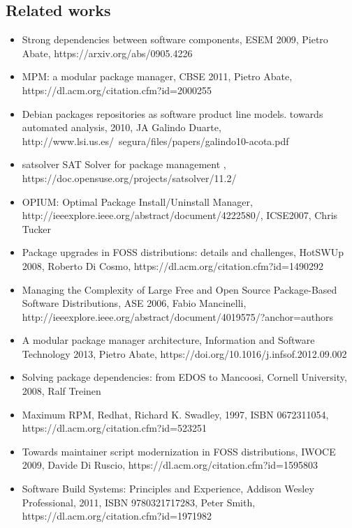 \subsection{Related works}
\begin{itemize}
    \item Strong dependencies between software components, ESEM 2009, 	Pietro Abate, https://arxiv.org/abs/0905.4226
    \item MPM: a modular package manager, CBSE 2011, Pietro Abate, https://dl.acm.org/citation.cfm?id=2000255
    \item Debian packages repositories as software product line models. towards automated analysis, 2010, JA Galindo Duarte, http://www.lsi.us.es/~segura/files/papers/galindo10-acota.pdf
    \item satsolver SAT Solver for package management , https://doc.opensuse.org/projects/satsolver/11.2/
    \item OPIUM: Optimal Package Install/Uninstall Manager, http://ieeexplore.ieee.org/abstract/document/4222580/, ICSE2007, Chris Tucker
    \item Package upgrades in FOSS distributions: details and challenges, HotSWUp 2008, Roberto Di Cosmo, https://dl.acm.org/citation.cfm?id=1490292
    \item Managing the Complexity of Large Free and Open Source Package-Based Software Distributions, ASE 2006, Fabio Mancinelli, http://ieeexplore.ieee.org/abstract/document/4019575/?anchor=authors
    \item A modular package manager architecture, Information and Software Technology 2013, Pietro Abate, https://doi.org/10.1016/j.infsof.2012.09.002
    \item Solving package dependencies: from EDOS to Mancoosi, Cornell University, 2008, Ralf Treinen 
    \item Maximum RPM, Redhat, Richard K. Swadley, 1997, ISBN 0672311054, 
https://dl.acm.org/citation.cfm?id=523251
    \item Towards maintainer script modernization in FOSS distributions, IWOCE 2009, Davide Di Ruscio, https://dl.acm.org/citation.cfm?id=1595803
    \item Software Build Systems: Principles and Experience, Addison Wesley Professional, 2011, ISBN 9780321717283, Peter Smith,  https://dl.acm.org/citation.cfm?id=1971982
\end{itemize}   

